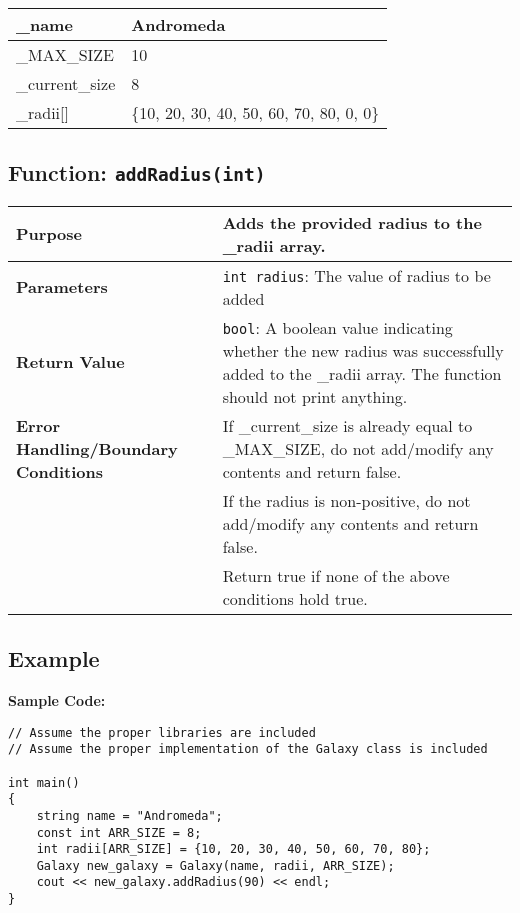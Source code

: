 \begin{table}[H]
    \centering
    \begin{tabular}{p{2in}|p{4in}}
        \_name & Andromeda \\
        \hline
        \_MAX\_SIZE & 10 \\
        \hline
        \_current\_size & 8 \\
        \hline
        \_radii[] & \{10, 20, 30, 40, 50, 60, 70, 80, 0, 0\} \\
    \end{tabular}
\end{table}

\subsection*{Function: \texttt{addRadius(int)}}

\begin{table}[H]
    \centering
    \begin{tabular}{p{2in}|p{4in}}
        \textbf{Purpose} & Adds the provided radius to the \_radii array. \\
        \hline
        \textbf{Parameters} & \texttt{int radius}: The value of radius to be added \\
        \hline
        \textbf{Return Value} & \texttt{bool}: A boolean value indicating whether the new radius was successfully added to the \_radii array. The function should not print anything. \\
        \hline
        \textbf{Error Handling/Boundary Conditions} & If \_current\_size is already equal to \_MAX\_SIZE, do not add/modify any contents and return false. \\
        & If the radius is non-positive, do not add/modify any contents and return false. \\
        & Return true if none of the above conditions hold true. \\
    \end{tabular}
\end{table}

\subsection*{Example}

\textbf{Sample Code:}

\begin{verbatim}
// Assume the proper libraries are included
// Assume the proper implementation of the Galaxy class is included

int main()
{
    string name = "Andromeda";
    const int ARR_SIZE = 8;
    int radii[ARR_SIZE] = {10, 20, 30, 40, 50, 60, 70, 80};
    Galaxy new_galaxy = Galaxy(name, radii, ARR_SIZE);
    cout << new_galaxy.addRadius(90) << endl;
}
\end{verbatim}

